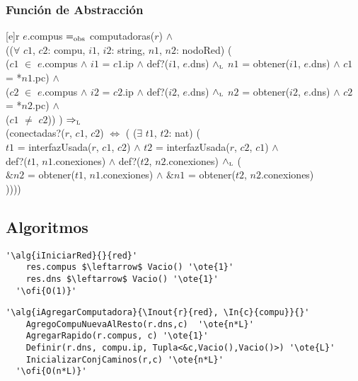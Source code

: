 

  \subsubsection{Función de Abstracción}

  [e]{r}{
    $e$.compus $=_{\mathrm{obs}}$ computadoras($r$) $\land$ \\
    (($\forall$ $c1$, $c2$: compu, $i1$, $i2$: string, $n1$, $n2$: nodoRed) ( \\
        \- \- ($c1$ $\in$ $e$.compus $\land$ $i1$ = $c1$.ip $\land$ def?($i1$, $e$.dns) $\land_{\mathrm{\scriptscriptstyle{L}}}$ $n1$ = obtener($i1$, $e$.dns) $\land$ $c1$ = *$n1$.pc) $\land$ \\
        \- \- ($c2$ $\in$ $e$.compus $\land$ $i2$ = $c2$.ip $\land$ def?($i2$, $e$.dns) $\land_{\mathrm{\scriptscriptstyle{L}}}$ $n2$ = obtener($i2$, $e$.dns) $\land$ $c2$ = *$n2$.pc) $\land$ \\
        \- \- ($c1$ $\neq$ $c2$))
        ) $\Rightarrow_{\mathrm{\scriptscriptstyle{L}}}$ \\
        \- \- \- \- (conectadas?($r$, $c1$, $c2$) $\Leftrightarrow$ ( ($\exists$ $t1$, $t2$: nat)  (\\
        \- \- \- \- \- \- $t1$ = interfazUsada($r$, $c1$, $c2$) $\land$ $t2$ = interfazUsada($r$, $c2$, $c1$) $\land$ \\
        \- \- \- \- \- \- def?($t1$, $n1$.conexiones) $\land$ def?($t2$, $n2$.conexiones) $\land_{\mathrm{\scriptscriptstyle{L}}}$ (\\
        \- \- \- \- \- \- \- \- $\&n2$ = obtener($t1$, $n1$.conexiones) $\land$ $\&n1$ = obtener($t2$, $n2$.conexiones) \\
        \- \- \- \- ))))
   }

\subsection{Algoritmos}
\lstset{style=alg,columns=fixed,basewidth=.5em}

\begin{lstlisting}[mathescape]
'\alg{iIniciarRed}{}{red}'
    res.compus $\leftarrow$ Vacio() '\ote{1}'
    res.dns $\leftarrow$ Vacio() '\ote{1}'
  '\ofi{O(1)}'
\end{lstlisting}

\begin{lstlisting}[mathescape]
'\alg{iAgregarComputadora}{\Inout{r}{red}, \In{c}{compu}}{}'
    AgregoCompuNuevaAlResto(r.dns,c)  '\ote{n*L}'
    AgregarRapido(r.compus, c) '\ote{1}'
    Definir(r.dns, compu.ip, Tupla<&c,Vacio(),Vacio()>) '\ote{L}'
    InicializarConjCaminos(r,c) '\ote{n*L}'
  '\ofi{O(n*L)}'
\end{lstlisting}

